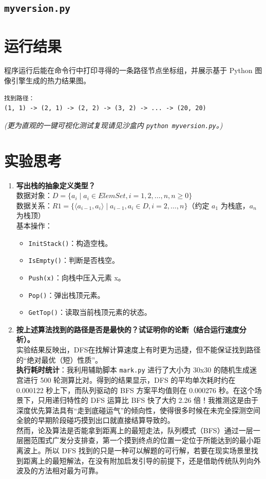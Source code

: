 \documentclass[12pt,a4paper]{ctexart}
\begin{document}
	\subsection{\texttt{myversion.py}}
	
	
	\section{运行结果}
	\noindent 程序运行后能在命令行中打印寻得的一条路径节点坐标组，并展示基于 Python 图像引擎生成的热力结果图。
	\begin{verbatim}
找到路径：
(1, 1) -> (2, 1) -> (2, 2) -> (3, 2) -> ... -> (20, 20)
	\end{verbatim}
	\noindent \textit{(更为直观的一键可视化测试复现请见沙盒内 \texttt{python myversion.py}。)}
	
	\section{实验思考}
	\noindent \begin{enumerate}
	\item \textbf{写出栈的抽象定义类型？}\\
	数据对象：$D = \{a_i \mid a_i \in ElemSet, i = 1, 2, \dots, n, n \ge 0\}$\\
	数据关系：$R1 = \{\langle a_{i-1}, a_i\rangle \mid a_{i-1}, a_i \in D, i = 2, \dots, n\}$（约定 $a_1$ 为栈底，$a_n$ 为栈顶）\\
	基本操作：
	\begin{itemize}
		\item \texttt{InitStack()}：构造空栈。
		\item \texttt{IsEmpty()}：判断是否栈空。
		\item \texttt{Push(x)}：向栈中压入元素 x。
		\item \texttt{Pop()}：弹出栈顶元素。
		\item \texttt{GetTop()}：读取当前栈顶元素的状态。
	\end{itemize}
	
	\item \textbf{按上述算法找到的路径是否是最快的？试证明你的论断（结合运行速度分析）。}\\
	实验结果反映出，DFS在找解计算速度上有时更为迅捷，但不能保证找到路径的“绝对最优（短）性质”。\\
	\textbf{执行耗时统计}：我利用辅助脚本 \texttt{mark.py} 进行了大小为 30x30 的随机生成迷宫进行 500 轮测算比对。得到的结果显示，DFS 的平均单次耗时约在 0.000122 秒上下，而队列驱动的 BFS 方案平均值则在 0.000276 秒。在这个场景下，只用递归特性的 DFS 运算比 BFS 快了大约 2.26 倍！我推测这是由于深度优先算法具有“走到底碰运气”的倾向性，使得很多时候在未完全探测空间全貌的早期阶段碰巧摸到出口就直接结算导致的。\\
	然而，论及算法是否能拿到距离上的最短走法，队列模式（BFS）通过一层一层圈范围式广发分支排查，第一个摸到终点的位置一定位于所能达到的最小距离波上。所以 DFS 找到的只是一种可以解题的可行解，若要在现实场景里找到距离上的最短解法，在没有附加启发引导的前提下，还是借助传统队列向外波及的方法相对最为可靠。
	\end{enumerate}
	
\end{document}
